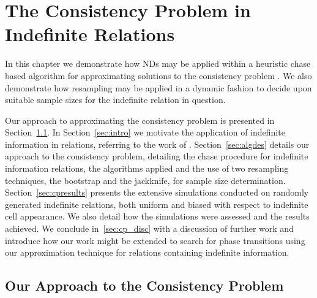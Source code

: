 \chapter{The Consistency Problem in Indefinite Relations}\label{chap:consistency}

In this chapter we demonstrate how NDs may be applied within a
heuristic chase based algorithm for approximating solutions to the
consistency problem \cite{vn95}. We also demonstrate how resampling
may be applied in a dynamic fashion to decide upon suitable sample
sizes for the indefinite relation in question.

\medskip

Our approach to approximating the consistency problem is presented in
Section~\ref{sec:conprob}. In Section~\ref{sec:intro} we motivate the
application of indefinite 
information in relations, referring to the work of
\cite{vn95,inv91,ivv95}.   Section~\ref{sec:algdes} details our
approach to the consistency problem, detailing the chase procedure for
indefinite information relations, the algorithms applied and the use
of two resampling techniques, the bootstrap and the jackknife, for
sample size determination. Section~\ref{sec:cpresults} presents the
extensive simulations conducted on randomly generated indefinite
relations, both uniform and biased with respect to indefinite cell
appearance. We also detail how the simulations were
assessed and the results achieved. We conclude in~\ref{sec:cp_disc}
with a discussion of further work and introduce how our work might be
extended to search for phase transitions using our approximation
technique for relations containing indefinite information.


\section{Our Approach to the Consistency Problem}\label{sec:conprob}


